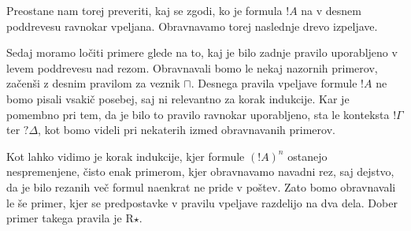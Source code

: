 Preostane nam torej preveriti, kaj se zgodi, ko je formula $!A$ na v desnem poddrevesu ravnokar vpeljana. Obravnavamo torej naslednje drevo izpeljave.
\begin{prooftree}

\end{prooftree}
Sedaj moramo ločiti primere glede na to, kaj je bilo zadnje pravilo uporabljeno v levem poddrevesu nad rezom. Obravnavali bomo le nekaj nazornih primerov, začenši z desnim pravilom za veznik $\sqcap$. Desnega pravila vpeljave formule $!A$ ne bomo pisali vsakič posebej, saj ni relevantno za korak indukcije. Kar je pomembno pri tem, da je bilo to pravilo ravnokar uporabljeno, sta le konteksta $!\Gamma$ ter $?\Delta$, kot bomo videli pri nekaterih izmed obravnavanih primerov.
\begin{prooftree}

\end{prooftree}
\dol
\begin{prooftree}



\end{prooftree}
Kot lahko vidimo je korak indukcije, kjer formule $(!A)^n$ ostanejo nespremenjene, čisto enak primerom, kjer obravnavamo navadni rez, saj dejstvo, da je bilo rezanih več formul naenkrat ne pride v poštev. Zato bomo obravnavali le še primer, kjer se predpostavke v pravilu vpeljave razdelijo na dva dela. Dober primer takega pravila je R$\star$.
\begin{prooftree}

\end{prooftree}

